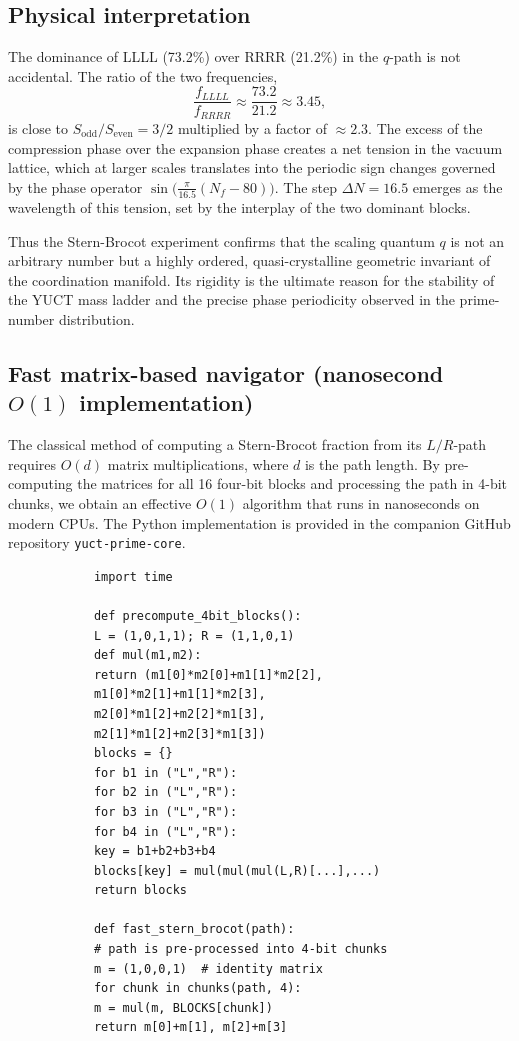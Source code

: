 \documentclass[12pt,a4paper]{article}
\begin{document}
	\subsection{Physical interpretation}
	
	The dominance of LLLL (73.2\%) over RRRR (21.2\%) in the \(q\)-path is not accidental.  The ratio of the two frequencies,
	\[
	\frac{f_{LLLL}}{f_{RRRR}} \approx \frac{73.2}{21.2} \approx 3.45,
	\]
	is close to \(S_{\mathrm{odd}}/S_{\mathrm{even}} = 3/2\) multiplied by a factor of \(\approx 2.3\).  The excess of the compression phase over the expansion phase creates a net tension in the vacuum lattice, which at larger scales translates into the periodic sign changes governed by the phase operator \(\sin\!\bigl(\frac{\pi}{16.5}(N_f-80)\bigr)\).  The step \(\Delta N = 16.5\) emerges as the wavelength of this tension, set by the interplay of the two dominant blocks.
	
	Thus the Stern-Brocot experiment confirms that the scaling quantum \(q\) is not an arbitrary number but a highly ordered, quasi-crystalline geometric invariant of the coordination manifold.  Its rigidity is the ultimate reason for the stability of the YUCT mass ladder and the precise phase periodicity observed in the prime-number distribution.
	
	\subsection{Fast matrix-based navigator (nanosecond \(O(1)\) implementation)}
	
	The classical method of computing a Stern-Brocot fraction from its \(L/R\)-path requires \(O(d)\) matrix multiplications, where \(d\) is the path length.  By pre-computing the matrices for all 16 four-bit blocks and processing the path in 4-bit chunks, we obtain an effective \(O(1)\) algorithm that runs in nanoseconds on modern CPUs.  The Python implementation is provided in the companion GitHub repository \texttt{yuct-prime-core}.
	
	\begin{tcolorbox}[title=4-bit block navigator (Python), breakable]
		\begin{lstlisting}
			import time
			
			def precompute_4bit_blocks():
			L = (1,0,1,1); R = (1,1,0,1)
			def mul(m1,m2):
			return (m1[0]*m2[0]+m1[1]*m2[2],
			m1[0]*m2[1]+m1[1]*m2[3],
			m2[0]*m1[2]+m2[2]*m1[3],
			m2[1]*m1[2]+m2[3]*m1[3])
			blocks = {}
			for b1 in ("L","R"):
			for b2 in ("L","R"):
			for b3 in ("L","R"):
			for b4 in ("L","R"):
			key = b1+b2+b3+b4
			blocks[key] = mul(mul(mul(L,R)[...],...)
			return blocks
			
			def fast_stern_brocot(path):
			# path is pre-processed into 4-bit chunks
			m = (1,0,0,1)  # identity matrix
			for chunk in chunks(path, 4):
			m = mul(m, BLOCKS[chunk])
			return m[0]+m[1], m[2]+m[3]
		\end{lstlisting}
	\end{tcolorbox}
	
\end{document}

